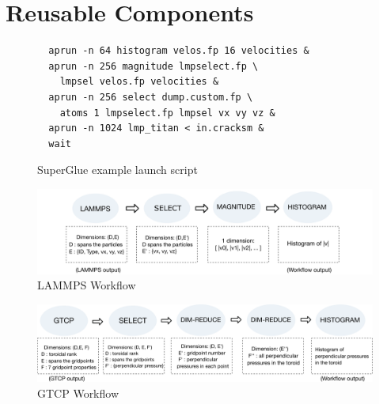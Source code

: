 \section{Reusable Components}
\label{s:reusable-components}

\begin{figure}
  \begin{lstlisting}
  aprun -n 64 histogram velos.fp 16 velocities &
  aprun -n 256 magnitude lmpselect.fp \
    lmpsel velos.fp velocities &
  aprun -n 256 select dump.custom.fp \
    atoms 1 lmpselect.fp lmpsel vx vy vz &
  aprun -n 1024 lmp_titan < in.cracksm &
  wait
  \end{lstlisting}
  \vspace{-0.15in}
  \caption{SuperGlue example launch script}
  \label{fig:launch-script}
  \vspace{-0.10in}
\end{figure}

\begin{figure}
  \vspace{-0.10in}
  \includegraphics[width=\linewidth]{fig/wflow3}
  \vspace{-0.35in}
  \caption{LAMMPS Workflow}
  \label{fig:lammps-workflow}
  \vspace{-0.05in}
\end{figure}

\begin{figure}
  \includegraphics[width=\linewidth]{fig/wflow4}
  \vspace{-0.35in}
  \caption{GTCP Workflow}
  \label{fig:gtcp-workflow}
  \vspace{-0.15in}
\end{figure}

